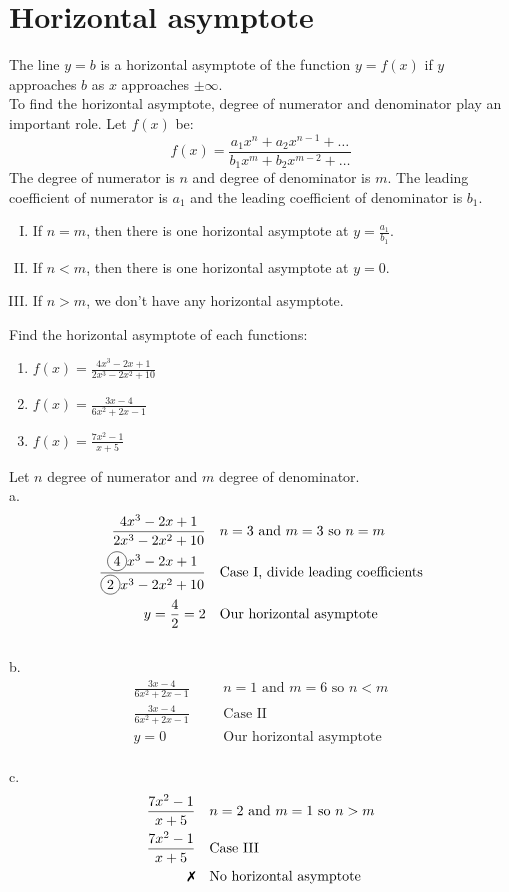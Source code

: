 \section{Horizontal asymptote}
The line $y = b$ is a horizontal asymptote of the function $y = f(x)$ if $y$ approaches $b$ as $x$ approaches $\pm \infty$.\\
To find the horizontal asymptote, degree of numerator and denominator play an important role. Let $f(x)$ be:
\begin{equation*}
        f(x)=\frac{a_1x^n+a_2x^{n-1}+\ldots}{b_1x^m+b_2x^{m-2}+\ldots}
\end{equation*}
The degree of numerator is $n$ and degree of denominator is $m$. The leading coefficient of numerator is $a_1$ and the leading coefficient of denominator is $b_1$.
\begin{enumerate}[I.]
    \item If $n=m$, then there is one horizontal asymptote at $y= \frac{a_1}{b_1}$.
    \item If $n<m$, then there is one horizontal asymptote at $y= 0$.
    \item If $n>m$, we don't have any horizontal asymptote.
\end{enumerate}
\begin{exa}
        Find the horizontal asymptote of each functions:
        \begin{enumerate}[\bfseries a.]
            \item $f(x)=\frac{4x^3-2x+1}{2x^3-2x^2+10}$
            \item $f(x)=\frac{3x-4}{6x^2+2x-1}$
            \item $f(x)=\frac{7x^2-1}{x+5}$
        \end{enumerate}
\end{exa}
Let $n$ degree of numerator and $m$ degree of denominator.\\
a.
\begin{align*}
    \frac{4x^3-2x+1}{2x^3-2x^2+10}&     &   &\text{$n=3$ and $m=3$ so $n=m$}\\
    \frac{\circled{4}x^3-2x+1}{\circled{2}x^3-2x^2+10}&    &
    &\text{Case I, divide leading coefficients}\\
    y=\frac{4}{2}=2&    &   &\text{Our horizontal asymptote}
\end{align*}
\\[0.2cm]
b.
\begin{align*}
    \frac{3x-4}{6x^2+2x-1}&     &   &\text{$n=1$ and $m=6$ so $n<m$}\\
    \frac{3x-4}{6x^2+2x-1}&    &  &\text{Case II}\\
    y=0&    &   &\text{Our horizontal asymptote}
\end{align*}
\\[0.2cm]
c.
\begin{align*}
    \frac{7x^2-1}{x+5}&     &   &\text{$n=2$ and $m=1$ so $n>m$}\\
    \frac{7x^2-1}{x+5}&    &  &\text{Case III}\\
    \xmark&    &   &\text{No horizontal asymptote}
\end{align*}